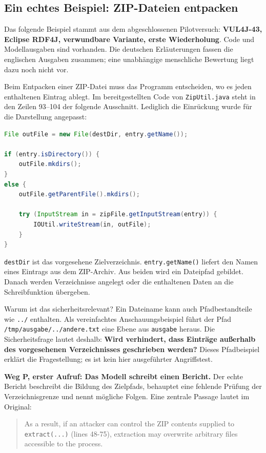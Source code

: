 \documentclass[10pt,a4paper]{article}
\begin{document}
\newpage
\subsection{Ein echtes Beispiel: ZIP-Dateien entpacken}
\label{sec:zip-example}
Das folgende Beispiel stammt aus dem abgeschlossenen Pilotversuch: \textbf{VUL4J-43, Eclipse RDF4J, verwundbare Variante, erste Wiederholung}. Code und Modellausgaben sind vorhanden. Die deutschen Erläuterungen fassen die englischen Ausgaben zusammen; eine unabhängige menschliche Bewertung liegt dazu noch nicht vor.

Beim Entpacken einer ZIP-Datei muss das Programm entscheiden, wo es jeden enthaltenen Eintrag ablegt. Im bereitgestellten Code von \texttt{ZipUtil.java} steht in den Zeilen 93--104 der folgende Ausschnitt. Lediglich die Einrückung wurde für die Darstellung angepasst:

\begin{lstlisting}[language=Java]
File outFile = new File(destDir, entry.getName());

if (entry.isDirectory()) {
    outFile.mkdirs();
}
else {
    outFile.getParentFile().mkdirs();

    try (InputStream in = zipFile.getInputStream(entry)) {
        IOUtil.writeStream(in, outFile);
    }
}
\end{lstlisting}

\texttt{destDir} ist das vorgesehene Zielverzeichnis. \texttt{entry.getName()} liefert den Namen eines Eintrags aus dem ZIP-Archiv. Aus beiden wird ein Dateipfad gebildet. Danach werden Verzeichnisse angelegt oder die enthaltenen Daten an die Schreibfunktion übergeben.

Warum ist das sicherheitsrelevant? Ein Dateiname kann auch Pfadbestandteile wie \texttt{../} enthalten. Als vereinfachtes Anschauungsbeispiel führt der Pfad \texttt{/tmp/ausgabe/../andere.txt} eine Ebene aus \texttt{ausgabe} heraus. Die Sicherheitsfrage lautet deshalb: \textbf{Wird verhindert, dass Einträge au\ss{}erhalb des vorgesehenen Verzeichnisses geschrieben werden?} Dieses Pfadbeispiel erklärt die Fragestellung; es ist kein hier ausgeführter Angriffstest.

\textbf{Weg P, erster Aufruf: Das Modell schreibt einen Bericht.} Der echte Bericht beschreibt die Bildung des Zielpfads, behauptet eine fehlende Prüfung der Verzeichnisgrenze und nennt mögliche Folgen. Eine zentrale Passage lautet im Original:

\begin{quote}\small
As a result, if an attacker can control the ZIP contents supplied to \texttt{extract(...)} (lines 48-75), extraction may overwrite arbitrary files accessible to the process.
\end{quote}
\end{document}

